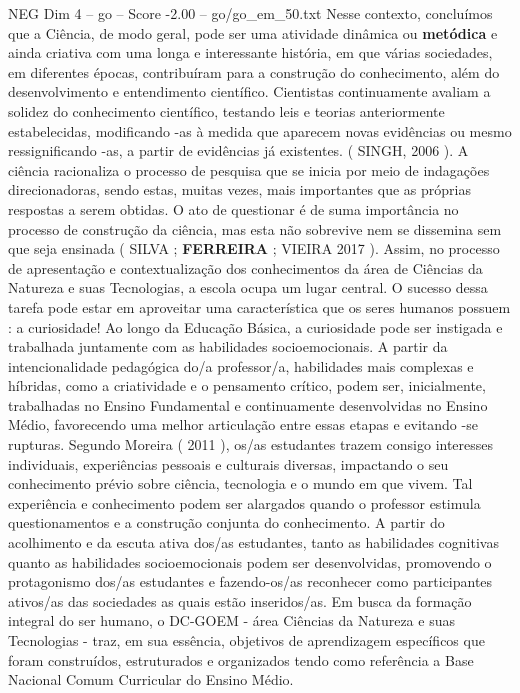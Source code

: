 \begin{textsample}{NEG Dim 4 – go – Score -2.00 – go/go\_em\_50.txt}
Nesse contexto, concluímos que a Ciência, de modo geral, pode ser uma atividade dinâmica ou \textbf{metódica} e ainda criativa com uma longa e interessante história, em que várias sociedades, em diferentes épocas, contribuíram para a construção do conhecimento, além do desenvolvimento e entendimento científico.
Cientistas continuamente avaliam a solidez do conhecimento científico, testando leis e teorias anteriormente estabelecidas, modificando -as à medida que aparecem novas evidências ou mesmo ressignificando -as, a partir de evidências já existentes. ( SINGH, 2006 ).
A ciência racionaliza o processo de pesquisa que se inicia por meio de indagações direcionadoras, sendo estas, muitas vezes, mais importantes que as próprias respostas a serem obtidas.
O ato de questionar é de suma importância no processo de construção da ciência, mas esta não sobrevive nem se dissemina sem que seja ensinada ( SILVA ; \textbf{FERREIRA} ; VIEIRA 2017 ).
Assim, no processo de apresentação e contextualização dos conhecimentos da área de Ciências da Natureza e suas Tecnologias, a escola ocupa um lugar central.
O sucesso dessa tarefa pode estar em aproveitar uma característica que os seres humanos possuem : a curiosidade!
Ao longo da Educação Básica, a curiosidade pode ser instigada e trabalhada juntamente com as habilidades socioemocionais.
A partir da intencionalidade pedagógica do/a professor/a, habilidades mais complexas e híbridas, como a criatividade e o pensamento crítico, podem ser, inicialmente, trabalhadas no Ensino Fundamental e continuamente desenvolvidas no Ensino Médio, favorecendo uma melhor articulação entre essas etapas e evitando -se rupturas.
Segundo Moreira ( 2011 ), os/as estudantes trazem consigo interesses individuais, experiências pessoais e culturais diversas, impactando o seu conhecimento prévio sobre ciência, tecnologia e o mundo em que vivem.
Tal experiência e conhecimento podem ser alargados quando o professor estimula questionamentos e a construção conjunta do conhecimento.
A partir do acolhimento e da escuta ativa dos/as estudantes, tanto as habilidades cognitivas quanto as habilidades socioemocionais podem ser desenvolvidas, promovendo o protagonismo dos/as estudantes e fazendo-os/as reconhecer como participantes ativos/as das sociedades as quais estão inseridos/as.
Em busca da formação integral do ser humano, o DC-GOEM - área Ciências da Natureza e suas Tecnologias - traz, em sua essência, objetivos de aprendizagem específicos que foram construídos, estruturados e organizados tendo como referência a Base Nacional Comum Curricular do Ensino Médio.

\end{textsample}
